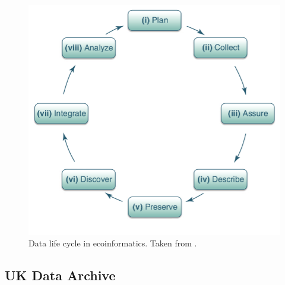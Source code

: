 \begin{figure}
    \center
    \includegraphics[scale=0.3]{img/data_lifecycle/ecoinformatics.png}
    \caption{Data life cycle in ecoinformatics. Taken from \cite{michener_ecoinformatics:_2012}.}
    \label{fig:ecoinformatics}
\end{figure}

\subsection{UK Data Archive}


